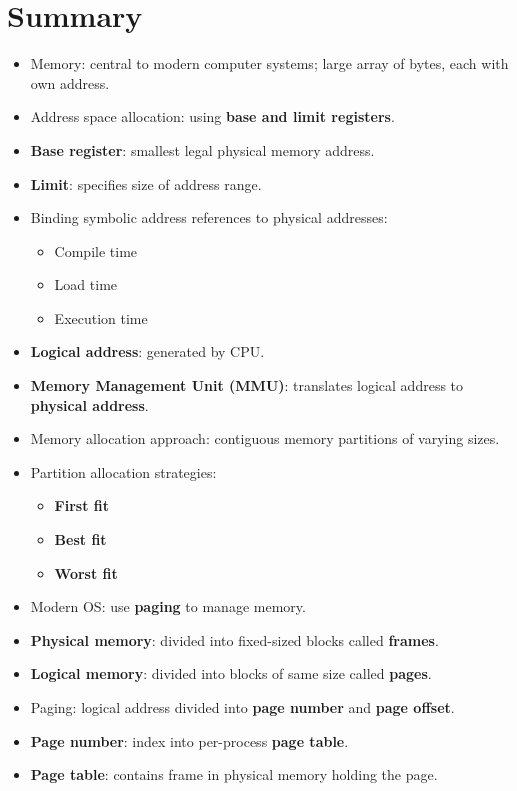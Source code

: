 \section{Summary}

\begin{itemize}
    \item Memory: central to modern computer systems; large array of bytes, each with own address.
    \item Address space allocation: using \textbf{base and limit registers}.
    \item \textbf{Base register}: smallest legal physical memory address.
    \item \textbf{Limit}: specifies size of address range.
    \item Binding symbolic address references to physical addresses:
    \begin{itemize}
        \item Compile time
        \item Load time
        \item Execution time
    \end{itemize}
    \item \textbf{Logical address}: generated by CPU.
    \item \textbf{Memory Management Unit (MMU)}: translates logical address to \textbf{physical address}.
    \item Memory allocation approach: contiguous memory partitions of varying sizes.
    \item Partition allocation strategies:
    \begin{itemize}
        \item \textbf{First fit}
        \item \textbf{Best fit}
        \item \textbf{Worst fit}
    \end{itemize}
    \item Modern OS: use \textbf{paging} to manage memory.
    \item \textbf{Physical memory}: divided into fixed-sized blocks called \textbf{frames}.
    \item \textbf{Logical memory}: divided into blocks of same size called \textbf{pages}.
    \item Paging: logical address divided into \textbf{page number} and \textbf{page offset}.
    \item \textbf{Page number}: index into per-process \textbf{page table}.
    \item \textbf{Page table}: contains frame in physical memory holding the page.

\end{itemize}
